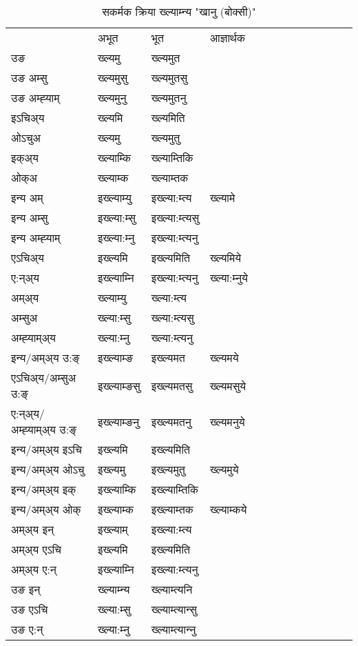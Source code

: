 \begin{table}[H]
\centering
\caption{\label{ɛm.vt} सकर्मक क्रिया  ख्ल्याम्‍न्य  "खानु (बोक्सी)"  }
\begin{tabular}{l|l|l|l|l|l|l|l|l|l|l|l|l}  \toprule
&अभूत & भूत & आज्ञार्थक \\ 
उङ &ख्ल्यमु &ख्ल्यमुत \\ 
उङ अम्सु &ख्ल्यमुसु &ख्ल्यमुतसु \\ 
उङ अम्ह्‍याम् &ख्ल्यमुनु &ख्ल्यमुतनु \\ 
इऽचिअ्य &ख्ल्यमि &ख्ल्यमिति   \\ 
ओऽचुअ &ख्ल्यमु &ख्ल्यमुतु   \\ 
इक्अ्य &ख्ल्याम्कि &ख्ल्याम्तिकि   \\ 
ओक्अ &ख्ल्याम्क &ख्ल्याम्तक   \\ 
इन्य अम् & इख्ल्याम्यु  & इख्ल्या:म्त्य &ख्ल्यामे  \\ 
इन्य अम्सु & इख्ल्या:म्सु  & इख्ल्या:म्त्यसु   \\ 
इन्य अम्ह्‍याम् & इख्ल्या:म्‍नु  & इख्ल्या:म्त्यनु   \\ 
एऽचिअ्य & इख्ल्यमि & इख्ल्यमिति &ख्ल्यमिये    \\ 
ए:न्अ्य & इख्ल्याम्‍नि  & इख्ल्या:म्त्यनु &ख्ल्या:म्‍नुये  \\ 
अम्अ्य & ख्ल्याम्यु  & ख्ल्या:म्त्य  \\ 
अम्सुअ & ख्ल्या:म्सु & ख्ल्या:म्त्यसु  \\ 
अम्ह्‍याम्अ्य & ख्ल्या:म्‍नु  & ख्ल्या:म्त्यनु \\ 
\midrule
इन्य/अम्अ्य उ:ङ्‌&इख्ल्याम्ङ & इख्ल्यमत &ख्ल्यमये \\ 
एऽचिअ्य/अम्सुअ उ:ङ्‌ &इख्ल्याम्ङसु & इख्ल्यमतसु &ख्ल्यमसुये \\ 
ए:न्अ्य/अम्ह्‍याम्अ्य उ:ङ्‌ &इख्ल्याम्ङनु & इख्ल्यमतनु &ख्ल्यमनुये \\ 
इन्य/अम्अ्य इऽचि & इख्ल्यमि & इख्ल्यमिति    \\ 
इन्य/अम्अ्य ओऽचु & इख्ल्यमु & इख्ल्यमुतु  &ख्ल्यमुये  \\ 
इन्य/अम्अ्य इक् & इख्ल्याम्कि & इख्ल्याम्तिकि   \\ 
इन्य/अम्अ्य ओक् & इख्ल्याम्क & इख्ल्याम्तक  &ख्ल्याम्कये  \\ 
अम्अ्य इन् & इख्ल्याम् & इख्ल्या:म्त्य   \\ 
अम्अ्य एऽचि & इख्ल्यमि & इख्ल्यमिति    \\ 
अम्अ्य ए:न् & इख्ल्याम्‍नि  & इख्ल्या:म्त्यनु  \\ 
\midrule
उङ इन् & ख्ल्याम्‍न्य  & ख्ल्याम्त्यनि  \\ 
उङ एऽचि & ख्ल्या:म्सु  & ख्ल्याम्त्यान्सु   \\ 
उङ ए:न्& ख्ल्या:म्‍नु  & ख्ल्याम्त्यान्‍नु   \\ 
\bottomrule
\end{tabular}
\end{table}


